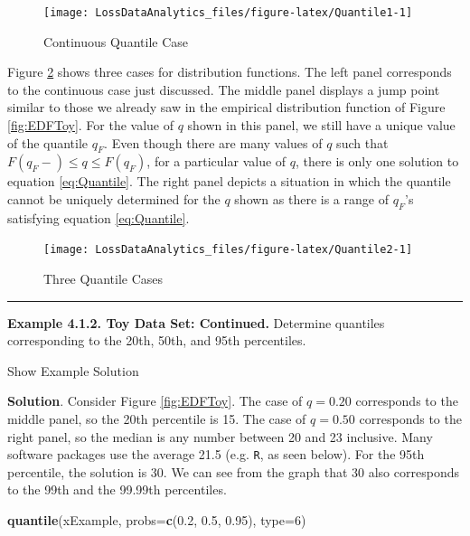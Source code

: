 \documentclass[]{book}
\newenvironment{Shaded}{\begin{snugshade}}{\end{snugshade}}
\newcommand{\KeywordTok}[1]{\textcolor[rgb]{0.13,0.29,0.53}{\textbf{#1}}}
\newcommand{\DataTypeTok}[1]{\textcolor[rgb]{0.13,0.29,0.53}{#1}}
\newcommand{\DecValTok}[1]{\textcolor[rgb]{0.00,0.00,0.81}{#1}}
\newcommand{\FloatTok}[1]{\textcolor[rgb]{0.00,0.00,0.81}{#1}}
\newcommand{\NormalTok}[1]{#1}
\theoremstyle{definition}
\theoremstyle{definition}
\theoremstyle{definition}
\theoremstyle{remark}
\begin{document}
\begin{figure}

{\centering \texttt{[image: LossDataAnalytics\_files/figure-latex/Quantile1-1]} 

}

\caption{Continuous Quantile Case}\label{fig:Quantile1}
\end{figure}

Figure \ref{fig:Quantile2} shows three cases for distribution functions.
The left panel corresponds to the continuous case just discussed. The
middle panel displays a jump point similar to those we already saw in
the empirical distribution function of Figure \ref{fig:EDFToy}. For the
value of \(q\) shown in this panel, we still have a unique value of the
quantile \(q_F\). Even though there are many values of \(q\) such that
\(F(q_F-) \le q \le F(q_F)\), for a particular value of \(q\), there is
only one solution to equation \eqref{eq:Quantile}. The right panel depicts
a situation in which the quantile cannot be uniquely determined for the
\(q\) shown as there is a range of \(q_F\)'s satisfying equation
\eqref{eq:Quantile}.

\begin{figure}

{\centering \texttt{[image: LossDataAnalytics\_files/figure-latex/Quantile2-1]} 

}

\caption{Three Quantile Cases}\label{fig:Quantile2}
\end{figure}

\begin{center}\rule{0.5\linewidth}{\linethickness}\end{center}

\textbf{Example 4.1.2. Toy Data Set: Continued.} Determine quantiles
corresponding to the 20th, 50th, and 95th percentiles.

Show Example Solution

\hypertarget{toggleExampleSelect.1.2}{}
\textbf{Solution}. Consider Figure \ref{fig:EDFToy}. The case of
\(q=0.20\) corresponds to the middle panel, so the 20th percentile is
15. The case of \(q=0.50\) corresponds to the right panel, so the median
is any number between 20 and 23 inclusive. Many software packages use
the average 21.5 (e.g. \texttt{R}, as seen below). For the 95th
percentile, the solution is 30. We can see from the graph that 30 also
corresponds to the 99th and the 99.99th percentiles.

\begin{Shaded}
\begin{Highlighting}[]
\KeywordTok{quantile}\NormalTok{(xExample, }\DataTypeTok{probs=}\KeywordTok{c}\NormalTok{(}\FloatTok{0.2}\NormalTok{, }\FloatTok{0.5}\NormalTok{, }\FloatTok{0.95}\NormalTok{), }\DataTypeTok{type=}\DecValTok{6}\NormalTok{)}
\end{Highlighting}
\end{Shaded}
\end{document}
